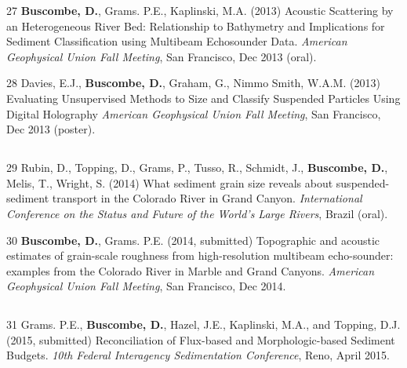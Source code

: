 \documentclass[margin,line]{resume}
\begin{document}
\begin{resume}
\begin{footnotesize}
\begin{list1}
	\item[27] {\bf Buscombe, D.}, Grams. P.E., Kaplinski, M.A. (2013) Acoustic Scattering by an Heterogeneous River Bed: Relationship to Bathymetry and Implications for Sediment Classification using Multibeam Echosounder Data. {\sl American Geophysical Union Fall Meeting}, San Francisco, Dec 2013 (oral). \\

	\item[28] Davies, E.J., {\bf Buscombe, D.}, Graham, G., Nimmo Smith, W.A.M. (2013) Evaluating Unsupervised Methods to Size and Classify Suspended Particles Using Digital Holography {\sl American Geophysical Union Fall Meeting}, San Francisco, Dec 2013 (poster). 
	\end{list1}

	\subsection{}
	\begin{list1}
        \item[29] Rubin, D., Topping, D., Grams, P., Tusso, R., Schmidt, J., {\bf Buscombe, D.}, Melis, T., Wright, S. (2014) What sediment grain size reveals about suspended-sediment transport in the Colorado River in Grand Canyon. {\sl International Conference on the Status and Future of the World's Large Rivers}, Brazil (oral).\\

        \item[30] {\bf Buscombe, D.}, Grams. P.E. (2014, submitted) Topographic and acoustic estimates of grain-scale roughness from high-resolution multibeam echo-sounder: examples from the Colorado River in Marble and Grand Canyons. {\sl American Geophysical Union Fall Meeting}, San Francisco, Dec 2014.
	\end{list1}

	\subsection{}
	\begin{list1}
        \item[31] Grams. P.E., {\bf Buscombe, D.}, Hazel, J.E., Kaplinski, M.A., and Topping, D.J. (2015, submitted) Reconciliation of Flux-based and Morphologic-based Sediment Budgets. {\sl 10th Federal Interagency Sedimentation Conference}, Reno, April 2015.\\


\end{list1}
\end{footnotesize}
\end{resume}
\end{document}
